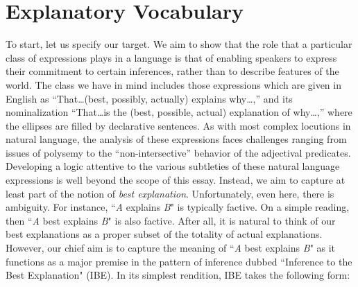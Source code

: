 \documentclass{article}
\newcommand{\fntext}[2]{\footnotetext[\getrefnumber{#1}]{#2}}
\theoremstyle{definition}
\theoremstyle{definition}
\theoremstyle{definition}
\theoremstyle{definition}
\theoremstyle{remark}
\theoremstyle{definition}
\theoremstyle{definition}
\begin{document}
%
%
%


\section{Explanatory Vocabulary}

To start, let us specify our target. We aim to show that the role that a particular class of expressions plays in a language is that of enabling speakers to express their commitment to certain inferences, rather than to describe features of the world. The class we have in mind includes those expressions which are given in English as ``That\ldots (best, possibly, actually) explains why\ldots,'' and its nominalization ``That\ldots is the (best, possible, actual) explanation of why\ldots,'' where the ellipses are filled by declarative sentences. As with most complex locutions in natural language, the analysis of these expressions faces challenges ranging from issues of polysemy to the ``non-intersective'' behavior of the adjectival predicates. Developing a logic attentive to the various subtleties of these natural language expressions is well beyond the scope of this essay. Instead, we aim to capture at least part of the notion of \textit{best explanation}. Unfortunately, even here, there is ambiguity. For instance, ``\textit{A} explains \textit{B}" is typically factive. On a simple reading, then ``\textit{A} best explains \textit{B}" is also factive. After all, it is natural to think of our best explanations as a proper subset of the totality of actual explanations. However, our chief aim is to capture the meaning of ``\textit{A} best explains \textit{B}"  as it functions as a major premise in the pattern of inference dubbed ``Inference to the Best Explanation" (IBE). In its simplest rendition, IBE takes the following form:
\end{document}
